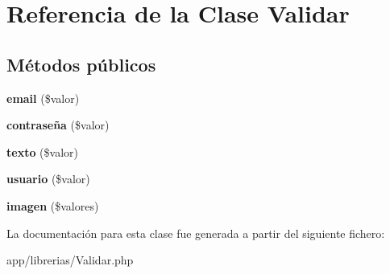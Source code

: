 \hypertarget{classValidar}{}\section{Referencia de la Clase Validar}
\label{classValidar}
\subsection*{Métodos públicos}
\begin{DoxyCompactItemize}
\item 
\mbox{\label{classValidar_ace4c9cb883bf6bfd860d6f9c0e7e3cf4}} 
{\bfseries email} (\$valor)
\item 
\mbox{\label{classValidar_a79caaa01372cea20421cd4ec07e46c1d}} 
{\bfseries contraseña} (\$valor)
\item 
\mbox{\label{classValidar_a97cb0990ca8be45233d047bc56c30bb9}} 
{\bfseries texto} (\$valor)
\item 
\mbox{\label{classValidar_a1ee554833e3b960d02c147b06bcb3f00}} 
{\bfseries usuario} (\$valor)
\item 
\mbox{\label{classValidar_a99a6554619b70d986e0a2de732c1d79c}} 
{\bfseries imagen} (\$valores)
\end{DoxyCompactItemize}


La documentación para esta clase fue generada a partir del siguiente fichero\+:\begin{DoxyCompactItemize}
\item 
app/librerias/Validar.\+php\end{DoxyCompactItemize}
